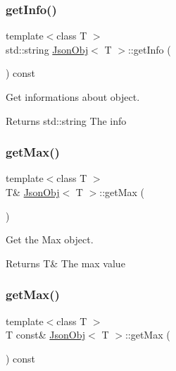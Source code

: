 \subsubsection{\texorpdfstring{get\+Info()}{getInfo()}}
{\footnotesize\ttfamily template$<$class T $>$ \\
std\+::string \hyperlink{class_json_obj}{Json\+Obj}$<$ T $>$\+::get\+Info (\begin{DoxyParamCaption}{ }\end{DoxyParamCaption}) const\hspace{0.3cm}{\ttfamily [inline]}}



Get informations about object. 

\begin{DoxyReturn}{Returns}
std\+::string The info 
\end{DoxyReturn}
\mbox{\label{class_json_obj_a177bcc3c169c4fb25f6d5833dc5d1fc6}} 
\subsubsection{\texorpdfstring{get\+Max()}{getMax()}\hspace{0.1cm}{\footnotesize\ttfamily [1/2]}}
{\footnotesize\ttfamily template$<$class T $>$ \\
T\& \hyperlink{class_json_obj}{Json\+Obj}$<$ T $>$\+::get\+Max (\begin{DoxyParamCaption}{ }\end{DoxyParamCaption})\hspace{0.3cm}{\ttfamily [inline]}}



Get the Max object. 

\begin{DoxyReturn}{Returns}
T\& The max value 
\end{DoxyReturn}
\mbox{\label{class_json_obj_af60a04f6565471c8a054698034ac5045}} 
\subsubsection{\texorpdfstring{get\+Max()}{getMax()}\hspace{0.1cm}{\footnotesize\ttfamily [2/2]}}
{\footnotesize\ttfamily template$<$class T $>$ \\
T const\& \hyperlink{class_json_obj}{Json\+Obj}$<$ T $>$\+::get\+Max (\begin{DoxyParamCaption}{ }\end{DoxyParamCaption}) const\hspace{0.3cm}{\ttfamily [inline]}}




